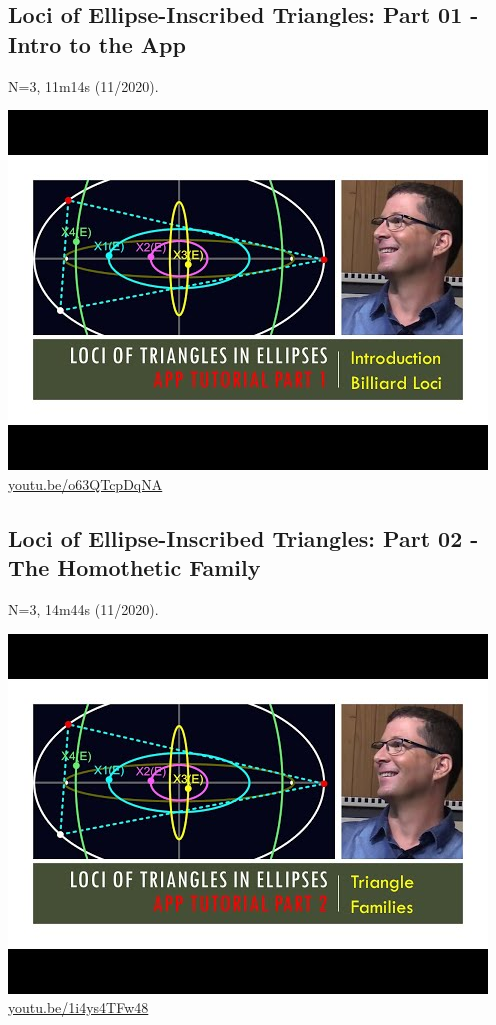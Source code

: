 \documentclass[12pt]{amsart}
\begin{document}
\subsection{Loci of Ellipse-Inscribed Triangles: Part 01 - Intro to the App}
\label{vid:o63QTcpDqNA}
\noindent N=3, 11m14s (11/2020). 
\begin{center}\includegraphics[width=.5\textwidth]{pics/o63QTcpDqNA.jpg} \\ 
\href{https://youtu.be/o63QTcpDqNA}{\url{youtu.be/o63QTcpDqNA}}\end{center}
% 

\subsection{Loci of Ellipse-Inscribed Triangles: Part 02 - The Homothetic Family}
\label{vid:1i4ys4TFw48}
\noindent N=3, 14m44s (11/2020). 
\begin{center}\includegraphics[width=.5\textwidth]{pics/1i4ys4TFw48.jpg} \\ 
\href{https://youtu.be/1i4ys4TFw48}{\url{youtu.be/1i4ys4TFw48}}\end{center}
% 
\end{document}
